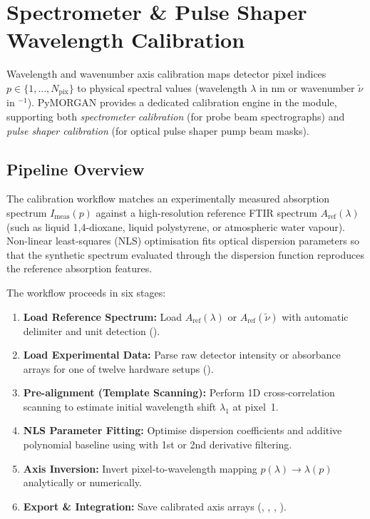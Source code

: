 \section{Spectrometer \& Pulse Shaper Wavelength Calibration}\label{sec:calibration}

Wavelength and wavenumber axis calibration maps detector pixel indices $p \in \{1, \dots, N_\text{pix}\}$ to physical spectral values (wavelength $\lambda$ in nm or wavenumber $\tilde{\nu}$ in $^{-1}$). PyMORGAN provides a dedicated calibration engine in the  module, supporting both \emph{spectrometer calibration} (for probe beam spectrographs) and \emph{pulse shaper calibration} (for optical pulse shaper pump beam masks).

\subsection{Pipeline Overview}

The calibration workflow matches an experimentally measured absorption spectrum $I_\text{meas}(p)$ against a high-resolution reference FTIR spectrum $A_\text{ref}(\lambda)$ (such as liquid 1,4-dioxane, liquid polystyrene, or atmospheric water vapour). Non-linear least-squares (NLS) optimisation fits optical dispersion parameters so that the synthetic spectrum evaluated through the dispersion function reproduces the reference absorption features.

The workflow proceeds in six stages:
\begin{enumerate}
  \item \textbf{Load Reference Spectrum:} Load $A_\text{ref}(\lambda)$ or $A_\text{ref}(\tilde{\nu})$ with automatic delimiter and unit detection ().
  \item \textbf{Load Experimental Data:} Parse raw detector intensity or absorbance arrays for one of twelve hardware setups ().
  \item \textbf{Pre-alignment (Template Scanning):} Perform 1D cross-correlation scanning to estimate initial wavelength shift $\lambda_1$ at pixel~1.
  \item \textbf{NLS Parameter Fitting:} Optimise dispersion coefficients and additive polynomial baseline using  with 1st or 2nd derivative filtering.
  \item \textbf{Axis Inversion:} Invert pixel-to-wavelength mapping $p(\lambda) \to \lambda(p)$ analytically or numerically.
  \item \textbf{Export \& Integration:} Save calibrated axis arrays (, , , ).
\end{enumerate}

